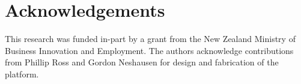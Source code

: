 \documentclass[preprint,authoryear,12pt]{elsarticle}
\begin{document}
\section*{Acknowledgements}
This research was funded in-part by a grant from the New Zealand Ministry of Business Innovation and Employment.
The authors acknowledge contributions from Phillip Ross and Gordon Neshausen for design and fabrication of the platform.







\end{document}

